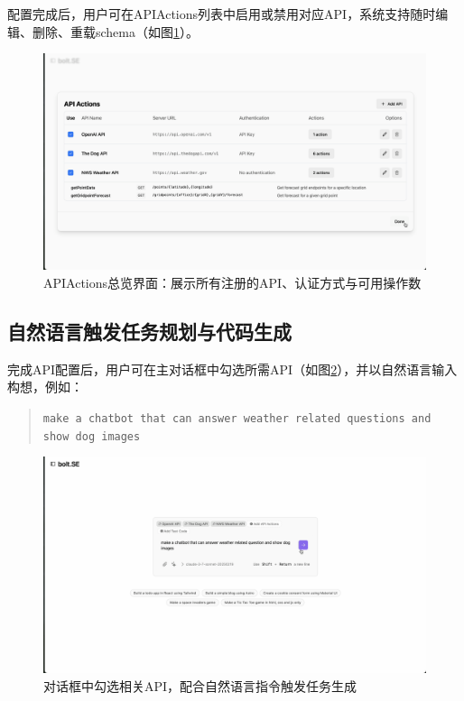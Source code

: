 配置完成后，用户可在APIActions列表中启用或禁用对应API，系统支持随时编辑、删除、重载schema（如图\ref{fig:demo_table}）。

\begin{figure}[htbp]
  \centering
  \includegraphics[width=\textwidth]{figures/screenshots/api-actions/demo_actions_table.png}
  \caption{APIActions总览界面：展示所有注册的API、认证方式与可用操作数}
  \label{fig:demo_table}
\end{figure}

\subsection{自然语言触发任务规划与代码生成}

完成API配置后，用户可在主对话框中勾选所需API（如图\ref{fig:demo_prompt}），并以自然语言输入构想，例如：

\begin{quote}
\texttt{make a chatbot that can answer weather related questions and show dog images}
\end{quote}

\begin{figure}[htbp]
  \centering
  \includegraphics[width=\textwidth]{figures/screenshots/api-actions/demo_prompt_tags.png}
  \caption{对话框中勾选相关API，配合自然语言指令触发任务生成}
  \label{fig:demo_prompt}
\end{figure}

